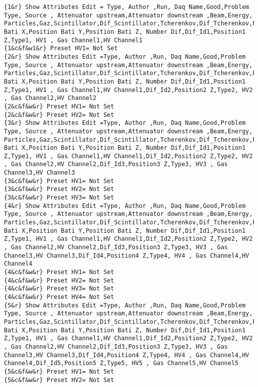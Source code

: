 {\begin{lstlisting}[breaklines=true,basicstyle=\tiny,postbreak=\mbox{\textcolor{red}{$\hookrightarrow$}\space},]
{1&r} Show Attributes Edit = Type, Author ,Run, Daq Name,Good,Problem Type, Source , Attenuator upstream,Attenuator downstream ,Beam,Energy, Particles,Gaz,Scintillator,Dif_Scintillator,Tcherenkov,Dif_Tcherenkov,Position Bati X,Position Bati Y,Position Bati Z, Number Dif,Dif_Id1,Position1 Z,Type1, HV1 , Gas Channel1,HV Channel1
{1&c&f&w1&r} Preset HV1= Not Set
{2&r} Show Attributes Edit =Type, Author ,Run, Daq Name,Good,Problem Type, Source , Attenuator upstream,Attenuator downstream ,Beam,Energy, Particles,Gaz,Scintillator,Dif_Scintillator,Tcherenkov,Dif_Tcherenkov,Position Bati X,Position Bati Y,Position Bati Z, Number Dif,Dif_Id1,Position1 Z,Type1, HV1 , Gas Channel1,HV Channel1,Dif_Id2,Position2 Z,Type2, HV2 , Gas Channel2,HV Channel2
{2&c&f&w&r} Preset HV1= Not Set
{2&c&f&w&r} Preset HV2= Not Set
{3&r} Show Attributes Edit =Type, Author ,Run, Daq Name,Good,Problem Type, Source , Attenuator upstream,Attenuator downstream ,Beam,Energy, Particles,Gaz,Scintillator,Dif_Scintillator,Tcherenkov,Dif_Tcherenkov,Position Bati X,Position Bati Y,Position Bati Z, Number Dif,Dif_Id1,Position1 Z,Type1, HV1 , Gas Channel1,HV Channel1,Dif_Id2,Position2 Z,Type2, HV2 , Gas Channel2,HV Channel2,Dif_Id3,Position3 Z,Type3, HV3 , Gas Channel3,HV Channel3
{3&c&f&w&r} Preset HV1= Not Set
{3&c&f&w&r} Preset HV2= Not Set
{3&c&f&w&r} Preset HV3= Not Set
{4&r} Show Attributes Edit =Type, Author ,Run, Daq Name,Good,Problem Type, Source , Attenuator upstream,Attenuator downstream ,Beam,Energy, Particles,Gaz,Scintillator,Dif_Scintillator,Tcherenkov,Dif_Tcherenkov,Position Bati X,Position Bati Y,Position Bati Z, Number Dif,Dif_Id1,Position1 Z,Type1, HV1 , Gas Channel1,HV Channel1,Dif_Id2,Position2 Z,Type2, HV2 , Gas Channel2,HV Channel2,Dif_Id3,Position3 Z,Type3, HV3 , Gas Channel3,HV Channel3,Dif_Id4,Position4 Z,Type4, HV4 , Gas Channel4,HV Channel4
{4&c&f&w&r} Preset HV1= Not Set
{4&c&f&w&r} Preset HV2= Not Set
{4&c&f&w&r} Preset HV3= Not Set
{4&c&f&w&r} Preset HV4= Not Set
{5&r} Show Attributes Edit =Type, Author ,Run, Daq Name,Good,Problem Type, Source , Attenuator upstream,Attenuator downstream ,Beam,Energy, Particles,Gaz,Scintillator,Dif_Scintillator,Tcherenkov,Dif_Tcherenkov,Position Bati X,Position Bati Y,Position Bati Z, Number Dif,Dif_Id1,Position1 Z,Type1, HV1 , Gas Channel1,HV Channel1,Dif_Id2,Position2 Z,Type2, HV2 , Gas Channel2,HV Channel2,Dif_Id3,Position3 Z,Type3, HV3 , Gas Channel3,HV Channel3,Dif_Id4,Position4 Z,Type4, HV4 , Gas Channel4,HV Channel4,Dif_Id5,Position5 Z,Type5, HV5 , Gas Channel5,HV Channel5
{5&c&f&w&r} Preset HV1= Not Set
{5&c&f&w&r} Preset HV2= Not Set

\end{lstlisting}}
